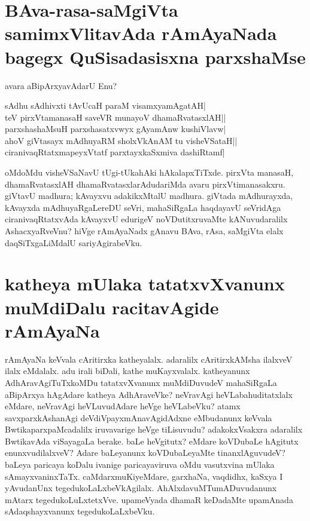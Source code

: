 \section*{BAva-rasa-saMgiVta samimxVlitavAda rAmAyaNada bagegx QuSisadasisxna parxshaMse}

avara aBipArxyavAdarU Enu?

\begin{shloka}
sAdhu sAdhivxti tAvUcaH paraM visamxyamAgatAH|\label{242a}\\
teV pirxVtamanasaH saveVR munayoV dhamaRvatasxlAH||\\
parxshashaMsuH parxshasatxvwyx gAyamAnw kushiVlavw|\label{243a}\\
ahoV giVtasayx mAdhuyaRM sholxVkAnAM tu visheVSataH||\\
ciranivaqRtatxmapeyxVtatf parxtayxkaSxmiva dashiRtamf|\label{243}\\
\end{shloka}

oMdoMdu visheVSaNavU tUgi-tUkahAki hAkalapxTiTxde. pirxVta manasaH, dhamaRvatasxlAH dhamaRvatasxlarAdudariMda avaru pirxVtimanasakxru. giVtavU madhura; kAvayxvu adakikxMtalU madhura. giVtada mAdhurayxda,  kAvayxda mAdhuyaRgaLereDU seVri, mahaSiRgaLa haqdayavU seVridAga ciranivaqRtatxvAda kAvayxvU edurigeV noVDutitxruvaMte kANuvudaralilx AshacxyaRveVnu? hiVge rAmAyaNadx gAnavu BAva, rAsa, saMgiVta elalx daqSiTxgaLiMdalU sariyAgirabeVku. 

\section*{katheya mUlaka tatatxvXvanunx muMdiDalu racitavAgide rAmAyaNa}

rAmAyaNa keVvala cAritirxka katheyalalx. adaralilx cAritirxkAMsha ilalxveV ilalx eMdalalx. adu irali biDali, kathe muKayxvalalx. katheyanunx AdhAravAgiTuTxkoMDu tatatxvXvanunx muMdiDuvudeV mahaSiRgaLa aBipArxya hAgAdare katheya AdhAraveVke? neVravAgi heVLabahuditatxlalx eMdare, neVravAgi heVLuvudAdare heVge heVLabeVku? atamx savxparxkAshanAgi deVdiVpayxmAnavAgidAdxne eMbudanunx keVvala BwtikaparxpaMcadalilx iruvavarige heVge tiLisuvudu? adakokxVsakxra adaralilx BwtikavAda viSayagaLa berake. baLe heVgitutx? eMdare koVDubaLe hAgitutx enunxvudilalxveV? Adare baLeyanunx koVDubaLeyaMte tinanxlAguvudeV? baLeya paricaya koDalu ivanige paricayaviruva oMdu vasutxvina mUlaka sAmayxvaninxTaTx. caMdarxmuKiyeMdare, garxhaNa, vaqdidhx, kaSxya I yAvudanUnx tegedukoLaLxbeVkAgilalx. AhAlxdavuMTumADuvudanunx mAtarx tegedukoLuLxtetxVve. upameVyada dhamaR keDadaMte upamAnada sAdaqshayxvanunx tegedukoLaLxbeVku. 

